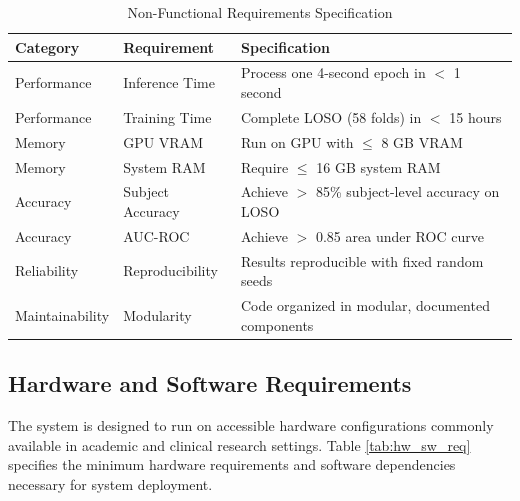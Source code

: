 \begin{table}[H]
    \centering
    \small
    \caption{Non-Functional Requirements Specification}
    \label{tab:nonfunctional_req}
    \begin{tabularx}{\textwidth}{|L{2.5cm}|L{3.5cm}|X|}
        \hline
        \textbf{Category} & \textbf{Requirement} & \textbf{Specification} \\
        \hline
        Performance & Inference Time & Process one 4-second epoch in $<$ 1 second \\
        \hline
        Performance & Training Time & Complete LOSO (58 folds) in $<$ 15 hours \\
        \hline
        Memory & GPU VRAM & Run on GPU with $\leq$ 8 GB VRAM \\
        \hline
        Memory & System RAM & Require $\leq$ 16 GB system RAM \\
        \hline
        Accuracy & Subject Accuracy & Achieve $>$ 85\% subject-level accuracy on LOSO \\
        \hline
        Accuracy & AUC-ROC & Achieve $>$ 0.85 area under ROC curve \\
        \hline
        Reliability & Reproducibility & Results reproducible with fixed random seeds \\
        \hline
        Maintainability & Modularity & Code organized in modular, documented components \\
        \hline
    \end{tabularx}
\end{table}

\subsection{Hardware and Software Requirements}

The system is designed to run on accessible hardware configurations commonly available in academic and clinical research settings. Table \ref{tab:hw_sw_req} specifies the minimum hardware requirements and software dependencies necessary for system deployment.

